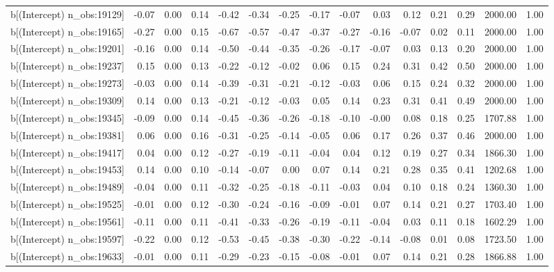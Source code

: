 \begin{table}[ht]
\begin{tabular}{rrrrrrrrrrrrrrr}
  b[(Intercept) n\_obs:19129] & -0.07 & 0.00 & 0.14 & -0.42 & -0.34 & -0.25 & -0.17 & -0.07 & 0.03 & 0.12 & 0.21 & 0.29 & 2000.00 & 1.00 \\ 
  b[(Intercept) n\_obs:19165] & -0.27 & 0.00 & 0.15 & -0.67 & -0.57 & -0.47 & -0.37 & -0.27 & -0.16 & -0.07 & 0.02 & 0.11 & 2000.00 & 1.00 \\ 
  b[(Intercept) n\_obs:19201] & -0.16 & 0.00 & 0.14 & -0.50 & -0.44 & -0.35 & -0.26 & -0.17 & -0.07 & 0.03 & 0.13 & 0.20 & 2000.00 & 1.00 \\ 
  b[(Intercept) n\_obs:19237] & 0.15 & 0.00 & 0.13 & -0.22 & -0.12 & -0.02 & 0.06 & 0.15 & 0.24 & 0.31 & 0.42 & 0.50 & 2000.00 & 1.00 \\ 
  b[(Intercept) n\_obs:19273] & -0.03 & 0.00 & 0.14 & -0.39 & -0.31 & -0.21 & -0.12 & -0.03 & 0.06 & 0.15 & 0.24 & 0.32 & 2000.00 & 1.00 \\ 
  b[(Intercept) n\_obs:19309] & 0.14 & 0.00 & 0.13 & -0.21 & -0.12 & -0.03 & 0.05 & 0.14 & 0.23 & 0.31 & 0.41 & 0.49 & 2000.00 & 1.00 \\ 
  b[(Intercept) n\_obs:19345] & -0.09 & 0.00 & 0.14 & -0.45 & -0.36 & -0.26 & -0.18 & -0.10 & -0.00 & 0.08 & 0.18 & 0.25 & 1707.88 & 1.00 \\ 
  b[(Intercept) n\_obs:19381] & 0.06 & 0.00 & 0.16 & -0.31 & -0.25 & -0.14 & -0.05 & 0.06 & 0.17 & 0.26 & 0.37 & 0.46 & 2000.00 & 1.00 \\ 
  b[(Intercept) n\_obs:19417] & 0.04 & 0.00 & 0.12 & -0.27 & -0.19 & -0.11 & -0.04 & 0.04 & 0.12 & 0.19 & 0.27 & 0.34 & 1866.30 & 1.00 \\ 
  b[(Intercept) n\_obs:19453] & 0.14 & 0.00 & 0.10 & -0.14 & -0.07 & 0.00 & 0.07 & 0.14 & 0.21 & 0.28 & 0.35 & 0.41 & 1202.68 & 1.00 \\ 
  b[(Intercept) n\_obs:19489] & -0.04 & 0.00 & 0.11 & -0.32 & -0.25 & -0.18 & -0.11 & -0.03 & 0.04 & 0.10 & 0.18 & 0.24 & 1360.30 & 1.00 \\ 
  b[(Intercept) n\_obs:19525] & -0.01 & 0.00 & 0.12 & -0.30 & -0.24 & -0.16 & -0.09 & -0.01 & 0.07 & 0.14 & 0.21 & 0.27 & 1703.40 & 1.00 \\ 
  b[(Intercept) n\_obs:19561] & -0.11 & 0.00 & 0.11 & -0.41 & -0.33 & -0.26 & -0.19 & -0.11 & -0.04 & 0.03 & 0.11 & 0.18 & 1602.29 & 1.00 \\ 
  b[(Intercept) n\_obs:19597] & -0.22 & 0.00 & 0.12 & -0.53 & -0.45 & -0.38 & -0.30 & -0.22 & -0.14 & -0.08 & 0.01 & 0.08 & 1723.50 & 1.00 \\ 
  b[(Intercept) n\_obs:19633] & -0.01 & 0.00 & 0.11 & -0.29 & -0.23 & -0.15 & -0.08 & -0.01 & 0.07 & 0.14 & 0.21 & 0.28 & 1866.88 & 1.00 \\ 

\end{tabular}
\end{table}
